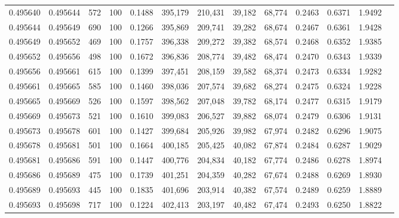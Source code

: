 \begin{tabular}{rrrrrrrrrrrrr}
0.495640 & 0.495644 &   572 & 100 &                                     0.1488 & 395,179 & 210,431 &  39,182 &  68,774 & 0.2463 & 0.6371 & 1.9492 \\
0.495644 & 0.495649 &   690 & 100 &                                     0.1266 & 395,869 & 209,741 &  39,282 &  68,674 & 0.2467 & 0.6361 & 1.9428 \\
0.495649 & 0.495652 &   469 & 100 &                                     0.1757 & 396,338 & 209,272 &  39,382 &  68,574 & 0.2468 & 0.6352 & 1.9385 \\
0.495652 & 0.495656 &   498 & 100 &                                     0.1672 & 396,836 & 208,774 &  39,482 &  68,474 & 0.2470 & 0.6343 & 1.9339 \\
0.495656 & 0.495661 &   615 & 100 &                                     0.1399 & 397,451 & 208,159 &  39,582 &  68,374 & 0.2473 & 0.6334 & 1.9282 \\
0.495661 & 0.495665 &   585 & 100 &                                     0.1460 & 398,036 & 207,574 &  39,682 &  68,274 & 0.2475 & 0.6324 & 1.9228 \\
0.495665 & 0.495669 &   526 & 100 &                                     0.1597 & 398,562 & 207,048 &  39,782 &  68,174 & 0.2477 & 0.6315 & 1.9179 \\
0.495669 & 0.495673 &   521 & 100 &                                     0.1610 & 399,083 & 206,527 &  39,882 &  68,074 & 0.2479 & 0.6306 & 1.9131 \\
0.495673 & 0.495678 &   601 & 100 &                                     0.1427 & 399,684 & 205,926 &  39,982 &  67,974 & 0.2482 & 0.6296 & 1.9075 \\
0.495678 & 0.495681 &   501 & 100 &                                     0.1664 & 400,185 & 205,425 &  40,082 &  67,874 & 0.2484 & 0.6287 & 1.9029 \\
0.495681 & 0.495686 &   591 & 100 &                                     0.1447 & 400,776 & 204,834 &  40,182 &  67,774 & 0.2486 & 0.6278 & 1.8974 \\
0.495686 & 0.495689 &   475 & 100 &                                     0.1739 & 401,251 & 204,359 &  40,282 &  67,674 & 0.2488 & 0.6269 & 1.8930 \\
0.495689 & 0.495693 &   445 & 100 &                                     0.1835 & 401,696 & 203,914 &  40,382 &  67,574 & 0.2489 & 0.6259 & 1.8889 \\
0.495693 & 0.495698 &   717 & 100 &                                     0.1224 & 402,413 & 203,197 &  40,482 &  67,474 & 0.2493 & 0.6250 & 1.8822 \\

\end{tabular}
